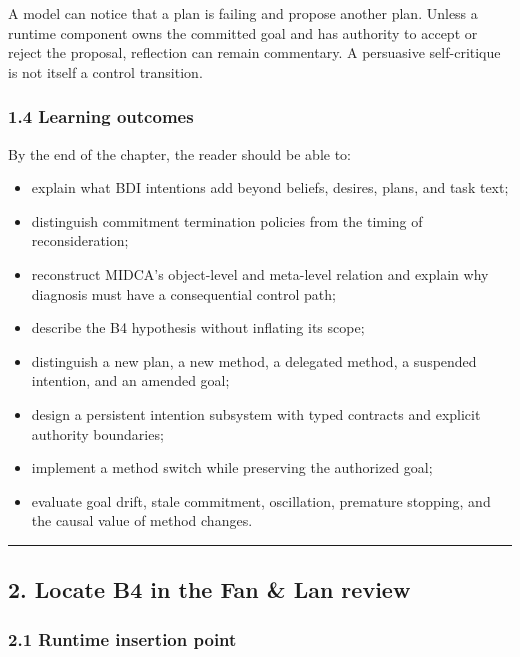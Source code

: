 A model can notice that a plan is failing and propose another plan. Unless a runtime component owns the committed goal and has authority to accept or reject the proposal, reflection can remain commentary. A persuasive self-critique is not itself a control transition.

\subsubsection{1.4 Learning outcomes}\label{learning-outcomes}

By the end of the chapter, the reader should be able to:

\begin{itemize}
\tightlist
\item
  explain what BDI intentions add beyond beliefs, desires, plans, and task text;
\item
  distinguish commitment termination policies from the timing of reconsideration;
\item
  reconstruct MIDCA's object-level and meta-level relation and explain why diagnosis must have a consequential control path;
\item
  describe the B4 hypothesis without inflating its scope;
\item
  distinguish a new plan, a new method, a delegated method, a suspended intention, and an amended goal;
\item
  design a persistent intention subsystem with typed contracts and explicit authority boundaries;
\item
  implement a method switch while preserving the authorized goal;
\item
  evaluate goal drift, stale commitment, oscillation, premature stopping, and the causal value of method changes.
\end{itemize}

\begin{center}\rule{0.5\linewidth}{0.5pt}\end{center}

\subsection{2. Locate B4 in the Fan \& Lan review}\label{locate-b4-in-the-fan-lan-review}

\subsubsection{2.1 Runtime insertion point}\label{runtime-insertion-point}

